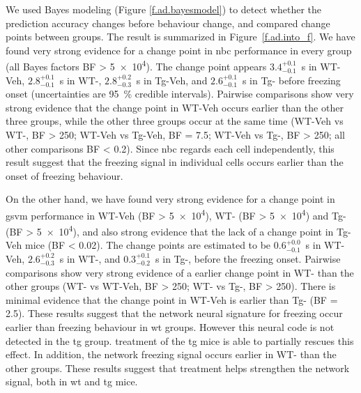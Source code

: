 We used Bayes modeling (Figure \ref{f.ad.bayesmodel}) to detect whether the prediction accuracy changes before behaviour change, and compared change points between groups. The result is summarized in Figure~\ref{f.ad.into_f}. We have found very strong evidence for a change point in \gls{nbc} performance in every group (all Bayes factors BF > \num{5e4}). The change point appears $3.4_{-0.1}^{+0.1}$\SI{}{\s} in WT-Veh, $2.8_{-0.1}^{+0.1}$\SI{}{\second} in WT-\glu, $2.8_{-0.3}^{+0.2}$\SI{}{\second} in Tg-Veh, and $2.6_{-0.1}^{+0.1}$\SI{}{\second} in Tg-\glu{} before freezing onset (uncertainties are \SI{95}{\percent} credible intervals). Pairwise comparisons show very strong evidence that the change point in WT-Veh occurs earlier than the other three groups, while the other three groups occur at the same time (WT-Veh vs WT-\glu, BF > \num{250}; WT-Veh vs Tg-Veh, BF = \num{7.5}; WT-Veh vs Tg-\glu, BF > \num{250}; all other comparisons BF < \num{0.2}). Since \gls{nbc} regards each cell independently, this result suggest that the freezing signal in individual cells occurs earlier than the onset of freezing behaviour.

On the other hand,  we have found very strong evidence for a change point in \gls{gsvm} performance in WT-Veh (BF > \num{5e4}), WT-\glu{} (BF > \num{5e4}) and Tg-\glu{} (BF > \num{5e4}), and also strong evidence that the lack of a change point in Tg-Veh mice (BF < \num{0.02}). The change points are estimated to be $0.6_{-0.1}^{+0.0}$\SI{}{\s} in WT-Veh, $2.6_{-0.3}^{+0.2}$\SI{}{\second} in WT-\glu, and $0.3_{-0.2}^{+0.1}$\SI{}{\s} in Tg-\glu, before the freezing onset. Pairwise comparisons show very strong evidence of a earlier change point in WT-\glu{} than the other groups (WT-\glu{} vs WT-Veh, BF > \num{250}; WT-\glu{} vs Tg-\glu, BF > \num{250}). There is minimal evidence that the change point in WT-Veh is earlier than Tg-\glu{} (BF = \num{2.5}). These results suggest that the network neural signature for freezing occur earlier than freezing behaviour in \gls{wt} groups. However this neural code is not detected in the \gls{tg} group. \tglu{} treatment of the \gls{tg} mice is able to partially rescues this effect. In addition, the network freezing signal occurs earlier in WT-\glu{} than the other groups. These results suggest that \tglu{} treatment helps strengthen the network signal, both in \gls{wt} and \gls{tg} mice. 


